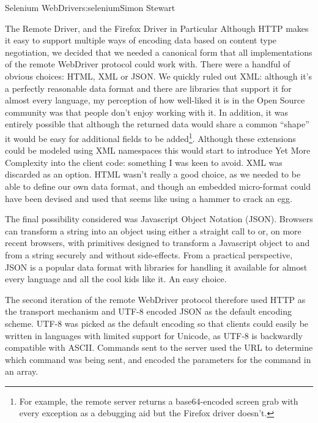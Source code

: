 \begin{aosachapter}{Selenium WebDriver}{s:selenium}{Simon Stewart}
\begin{aosasect1}{The Remote Driver, and the Firefox Driver in Particular}
Although HTTP makes it easy to support multiple ways of encoding data
based on content type negotiation, we decided that we needed a
canonical form that all implementations of the remote WebDriver
protocol could work with. There were a handful of obvious choices:
HTML, XML or JSON\@. We quickly ruled out XML: although it's a
perfectly reasonable data format and there are libraries that support
it for almost every language, my perception of how well-liked it is in
the Open Source community was that people don't enjoy working with
it. In addition, it was entirely possible that although the returned
data would share a common ``shape'' it would be easy for additional
fields to be added\footnote{For example, the remote server returns a
base64-encoded screen grab with every exception as a debugging aid
but the Firefox driver doesn't.}. Although these extensions could be
modeled using XML namespaces this would start to introduce Yet More
Complexity into the client code: something I was keen to avoid.  XML
was discarded as an option.  HTML wasn't really a good choice, as we
needed to be able to define our own data format, and though an
embedded micro-format could have been devised and used that seems like
using a hammer to crack an egg.

The final possibility considered was Javascript Object Notation
(JSON). Browsers can transform a string into an object using either a
straight call to  or, on more recent browsers, with
primitives designed to transform a Javascript object to and from a
string securely and without side-effects. From a practical
perspective, JSON is a popular data format with libraries for handling
it available for almost every language and all the cool kids like
it. An easy choice.

The second iteration of the remote WebDriver protocol therefore used
HTTP as the transport mechanism and UTF-8 encoded JSON as the default
encoding scheme. UTF-8 was picked as the default encoding so that
clients could easily be written in languages with limited support for
Unicode, as UTF-8 is backwardly compatible with ASCII\@. Commands sent
to the server used the URL to determine which command was being sent,
and encoded the parameters for the command in an array.


\end{aosasect1}
\end{aosachapter}
